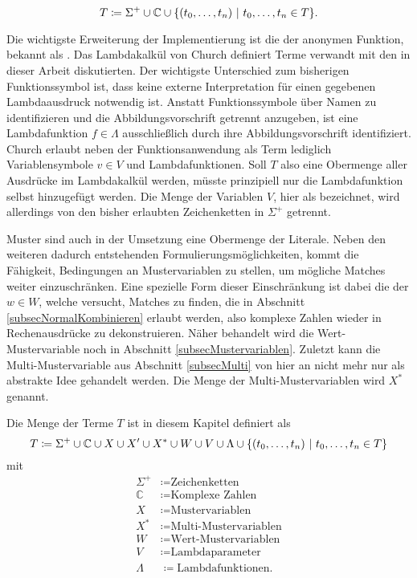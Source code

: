 $$T \coloneqq \Sigma^+ \cup \mathbb C \cup \curl*{(\elems t 0 n)~|~ \elems t 0 n \in T}.$$

Die wichtigste Erweiterung der Implementierung ist die der anonymen Funktion, bekannt als . Das Lambdakalkül von Church \cite{ChurchLambda36} definiert Terme verwandt mit den in dieser Arbeit diskutierten. Der wichtigste Unterschied zum bisherigen Funktionssymbol ist, dass keine externe Interpretation für einen gegebenen Lambdaausdruck notwendig ist. Anstatt Funktionssymbole über Namen zu identifizieren und die Abbildungsvorschrift getrennt anzugeben, ist eine Lambdafunktion $f \in \Lambda$ ausschließlich durch ihre Abbildungsvorschrift identifiziert. Church erlaubt neben der Funktionsanwendung als Term lediglich Variablensymbole  $v \in V$ und Lambdafunktionen. Soll $T$ also eine Obermenge aller Ausdrücke im Lambdakalkül werden, müsste prinzipiell nur die Lambdafunktion selbst hinzugefügt werden. Die Menge der Variablen $V$, hier als  bezeichnet, wird allerdings von den bisher erlaubten Zeichenketten in $\Sigma^+$ getrennt.

Muster sind auch in der Umsetzung eine Obermenge der Literale. 
Neben den weiteren dadurch entstehenden Formulierungsmöglichkeiten, kommt die Fähigkeit, Bedingungen an Mustervariablen zu stellen, um mögliche Matches weiter einzuschränken. 
Eine spezielle Form dieser Einschränkung ist dabei die der  $w \in W$, welche versucht, Matches zu finden, die in Abschnitt \ref{subsecNormalKombinieren} erlaubt werden, also komplexe Zahlen wieder in Rechenausdrücke zu dekonstruieren. Näher behandelt wird die Wert-Mustervariable noch in Abschnitt \ref{subsecMustervariablen}. 
Zuletzt kann die Multi-Mustervariable aus Abschnitt \ref{subsecMulti} von hier an nicht mehr nur als abstrakte Idee gehandelt werden. Die Menge der Multi-Mustervariablen wird $X^*$ genannt. 

\begin{definition} \label{defKnotentypenMathe}
Die Menge der Terme $T$ ist in diesem Kapitel definiert als
$$T \coloneqq \Sigma^+ \cup \mathbb C \cup X \cup X' \cup X^* \cup W \cup V \cup \Lambda \cup \curl*{(\elems t 0 n)~|~ \elems t 0 n \in T}$$
mit
\begin{align*}
    \Sigma^+  &\coloneqq \text{Zeichenketten}\\
    \mathbb C &\coloneqq \text{Komplexe Zahlen}\\
    X         &\coloneqq \text{Mustervariablen}\\
    X^*       &\coloneqq \text{Multi-Mustervariablen}\\
    W         &\coloneqq \text{Wert-Mustervariablen}\\
    V         &\coloneqq \text{Lambdaparameter}\\
    \Lambda   &\coloneqq \text{Lambdafunktionen}.
\end{align*}
\end{definition}






